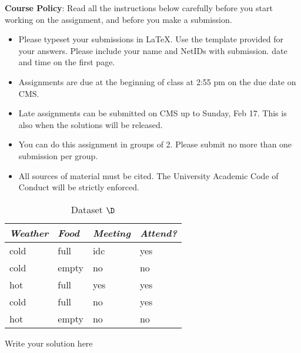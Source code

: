 \documentclass[a4 paper]{article}
\begin{document}
\textbf{Course Policy}: Read all the instructions below carefully before you start working on the assignment, and before you make a submission.
\begin{itemize}
    \item Please typeset your submissions in \LaTeX. Use the template provided for your answers. Please include your name and NetIDs with submission. 
date and time on the first page.
    \item Assignments are due at the beginning of class at 2:55 pm on the due date on CMS.
    \item Late assignments can be submitted on CMS up to Sunday, Feb 17. This is also when the solutions will be released.
    \item You can do this assignment in groups of 2. Please submit no more than one submission per group.
    \item All sources of material must be cited. The University Academic Code of Conduct
will be strictly enforced.
\end{itemize}

\begin{table}[h]
\centering
\begin{tabular}{@{}lll|l@{}}
\toprule
\textit{Weather} & \textit{Food} & \textit{Meeting} & \textit{Attend?} \\ \midrule
cold             & full          & idc              & yes              \\
cold             & empty         & no               & no               \\
hot              & full          & yes              & yes              \\
cold             & full          & no               & yes              \\
hot              & empty         & no               & no               \\ \bottomrule
\end{tabular}
\caption{Dataset $\D$\label{table:1}}
\end{table}


 Write your solution here




\end{document}
